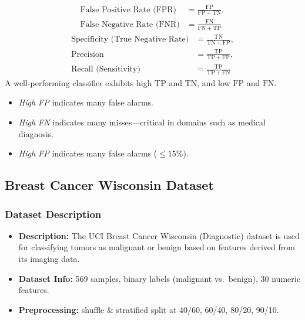 \begin{flushleft}
\begin{itemize}
\begin{flushleft}
\begin{align*}
				      \text{False Positive Rate (FPR)} & = \frac{\mathrm{FP}}{\mathrm{FP} + \mathrm{TN}},                                           \\
				      \text{False Negative Rate (FNR)} & = \frac{\mathrm{FN}}{\mathrm{FN} + \mathrm{TP}}
			      \end{align*}
			      \begin{align*}
				      \text{Specificity (True Negative Rate)} & = \frac{\mathrm{TN}}{\mathrm{TN} + \mathrm{FP}}, \\
				      \text{Precision}                        & = \frac{\mathrm{TP}}{\mathrm{TP} + \mathrm{FP}}, \\
				      \text{Recall (Sensitivity)}             & = \frac{\mathrm{TP}}{\mathrm{TP} + \mathrm{FN}}
			      \end{align*}
			      \noindent A well‐performing classifier exhibits high \(\mathrm{TP}\) and \(\mathrm{TN}\), and low \(\mathrm{FP}\) and \(\mathrm{FN}\).
			      \begin{itemize}
				      \item \emph{High FP} indicates many false alarms.
				      \item \emph{High FN} indicates many misses—critical in domains such as medical diagnosis.
				      \item \emph{High FP} indicates many false alarms (\(\leq 15\%\)).
			      \end{itemize}
		      \end{flushleft}
	\end{itemize}
\end{flushleft}

\clearpage
\subsection{Breast Cancer Wisconsin Dataset}
\subsubsection*{Dataset Description}
\begin{itemize}
	\item \textbf{Description:} The UCI Breast Cancer Wisconsin (Diagnostic) dataset is used for classifying tumors as malignant or benign based on features derived from its imaging data.
	\item \textbf{Dataset Info:} 569 samples, binary labels (malignant vs.\ benign), 30 numeric features.
	\item \textbf{Preprocessing:} shuffle \& stratified split at 40/60, 60/40, 80/20, 90/10.
\end{itemize}

